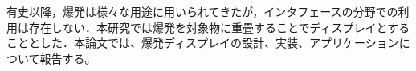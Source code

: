 \begin{jabstract}

有史以降，爆発は様々な用途に用いられてきたが，インタフェースの分野での利用は存在しない．本研究では爆発を対象物に重畳することでディスプレイとすることとした．本論文では、爆発ディスプレイの設計、実装、アプリケーションについて報告する。

\end{jabstract}